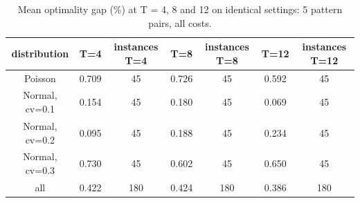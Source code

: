 \begin{table}[H]
\centering
\caption{Mean optimality gap (\%) at T = 4, 8 and 12 on identical settings: 5 pattern pairs, all costs.}
\label{tab:test2_T_matched}
\begin{tabular}{ccccccc}
\toprule
distribution & T=4 & instances T=4 & T=8 & instances T=8 & T=12 & instances T=12 \\
\midrule
Poisson & 0.709 & 45 & 0.726 & 45 & 0.592 & 45 \\
Normal, cv=0.1 & 0.154 & 45 & 0.180 & 45 & 0.069 & 45 \\
Normal, cv=0.2 & 0.095 & 45 & 0.188 & 45 & 0.234 & 45 \\
Normal, cv=0.3 & 0.730 & 45 & 0.602 & 45 & 0.650 & 45 \\
all & 0.422 & 180 & 0.424 & 180 & 0.386 & 180 \\
\bottomrule
\end{tabular}
\end{table}